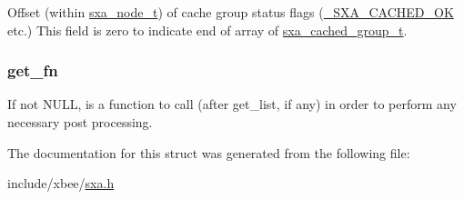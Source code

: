Offset (within \hyperlink{structsxa__node__t}{sxa\-\_\-node\-\_\-t}) of cache group status flags (\hyperlink{group___s_x_a_gga0411cd49bb5b71852cecd93bcbf0ca2da54498f64b3ad7c2be423d32b45deac04}{\-\_\-\-S\-X\-A\-\_\-\-C\-A\-C\-H\-E\-D\-\_\-\-O\-K} etc.) This field is zero to indicate end of array of \hyperlink{structsxa__cached__group__t}{sxa\-\_\-cached\-\_\-group\-\_\-t}. 

\hypertarget{structsxa__cached__group__t_aa73aae7aa31e051678e55ca4025a2d3a}{
\subsubsection[{get\-\_\-fn}]{ get\-\_\-fn}}\label{structsxa__cached__group__t_aa73aae7aa31e051678e55ca4025a2d3a}


If not N\-U\-L\-L, is a function to call (after get\-\_\-list, if any) in order to perform any necessary post processing. 



The documentation for this struct was generated from the following file\-:\begin{DoxyCompactItemize}
\item 
include/xbee/\hyperlink{sxa_8h}{sxa.\-h}\end{DoxyCompactItemize}
